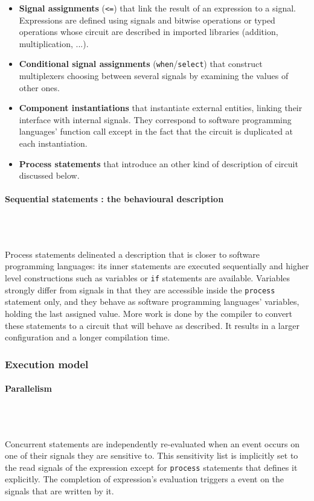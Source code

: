 \documentclass[10pt,a4paper]{article}
\newcommand{\code}{\texttt}
\renewcommand{\indent}{~\\\vspace{-.8cm}}
\newcommand{\pindent}{~\\\indent}
\begin{document}
\begin{itemize}
	\item \textbf{Signal assignments} (\code{<=}) that link the result of an expression to a signal. Expressions are defined using signals and bitwise operations or typed operations whose circuit are described in imported libraries (addition, multiplication, ...).
	\item \textbf{Conditional signal assignments} (\code{when}/\code{select}) that construct multiplexers choosing between several signals by examining the values of other ones.
	\item \textbf{Component instantiations} that instantiate external entities, linking their interface with internal signals. They correspond to software programming languages' function call except in the fact that the circuit is duplicated at each instantiation.
	\item \textbf{Process statements} that introduce an other kind of description of circuit discussed below.
\end{itemize}


\paragraph{Sequential statements : the behavioural description}\pindent

Process statements delineated a description that is closer to software programming languages: its inner statements are executed sequentially and higher level constructions such as variables or \code{if} statements are available. Variables strongly differ from signals in that they are accessible inside the \code{process} statement only, and they behave as software programming languages' variables, holding the last assigned value. More work is done by the compiler to convert these statements to a circuit that will behave as described. It results in a larger configuration and a longer compilation time.

\subsubsection{Execution model}

\paragraph{Parallelism}\pindent


Concurrent statements are independently re-evaluated when an event occurs on one of their signals they are sensitive to. This sensitivity list is implicitly set to the read signals of the expression except for \code {process} statements that defines it explicitly. The completion of expression's evaluation triggers a event on the signals that are written by it.\\
\end{document}
